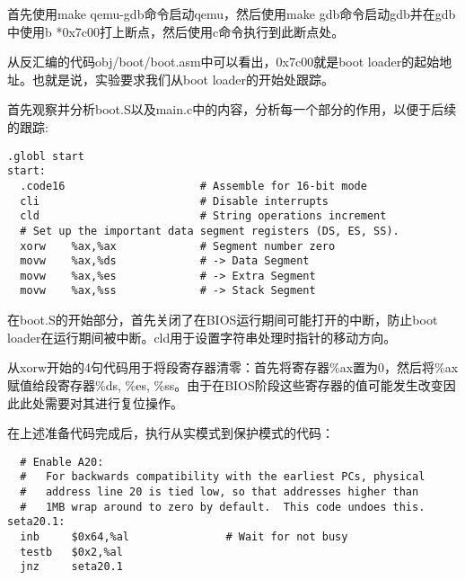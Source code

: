 
\begin{exerciseSolution}{3}
\par 首先使用make qemu-gdb命令启动qemu，然后使用make gdb命令启动gdb并在gdb中使用b *0x7c00打上断点，然后使用c命令执行到此断点处。
\par 从反汇编的代码obj/boot/boot.asm中可以看出，0x7c00就是boot loader的起始地址。也就是说，实验要求我们从boot loader的开始处跟踪。

\par 首先观察并分析boot.S以及main.c中的内容，分析每一个部分的作用，以便于后续的跟踪:
\begin{lstlisting}
.globl start
start:
  .code16                     # Assemble for 16-bit mode
  cli                         # Disable interrupts
  cld                         # String operations increment
  # Set up the important data segment registers (DS, ES, SS).
  xorw    %ax,%ax             # Segment number zero
  movw    %ax,%ds             # -> Data Segment
  movw    %ax,%es             # -> Extra Segment
  movw    %ax,%ss             # -> Stack Segment
\end{lstlisting}
\par 在boot.S的开始部分，首先关闭了在BIOS运行期间可能打开的中断，防止boot loader在运行期间被中断。cld用于设置字符串处理时指针的移动方向。
\par 从xorw开始的4句代码用于将段寄存器清零：首先将寄存器\%ax置为0，然后将\%ax赋值给段寄存器\%ds, \%es, \%ss。由于在BIOS阶段这些寄存器的值可能发生改变因此此处需要对其进行复位操作。

\par 在上述准备代码完成后，执行从实模式到保护模式的代码：
\begin{lstlisting}
  # Enable A20:
  #   For backwards compatibility with the earliest PCs, physical
  #   address line 20 is tied low, so that addresses higher than
  #   1MB wrap around to zero by default.  This code undoes this.
seta20.1:
  inb     $0x64,%al               # Wait for not busy
  testb   $0x2,%al
  jnz     seta20.1


\end{lstlisting}
\end{exerciseSolution}
